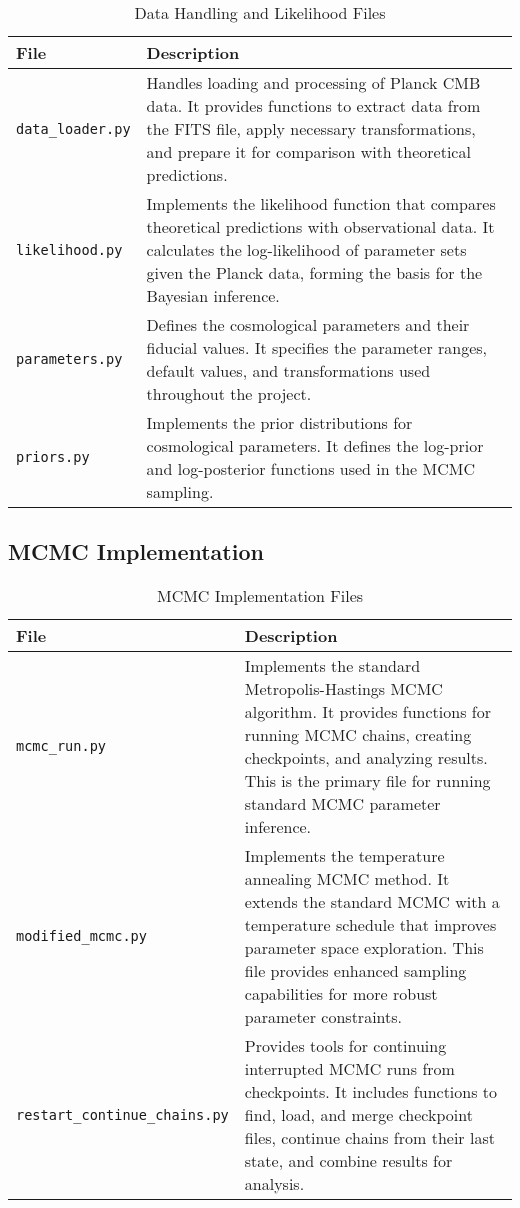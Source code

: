\documentclass[11pt]{article}
\begin{document}
\begin{table}[H]
\centering
\begin{tabular}{p{4cm}p{11cm}}
\toprule
\textbf{File} & \textbf{Description} \\
\midrule
\texttt{data\_loader.py} & Handles loading and processing of Planck CMB data. It provides functions to extract data from the FITS file, apply necessary transformations, and prepare it for comparison with theoretical predictions. \\
\addlinespace
\texttt{likelihood.py} & Implements the likelihood function that compares theoretical predictions with observational data. It calculates the log-likelihood of parameter sets given the Planck data, forming the basis for the Bayesian inference. \\
\addlinespace
\texttt{parameters.py} & Defines the cosmological parameters and their fiducial values. It specifies the parameter ranges, default values, and transformations used throughout the project. \\
\addlinespace
\texttt{priors.py} & Implements the prior distributions for cosmological parameters. It defines the log-prior and log-posterior functions used in the MCMC sampling. \\
\bottomrule
\end{tabular}
\caption{Data Handling and Likelihood Files}
\label{tab:data-likelihood-files}
\end{table}

\subsection{MCMC Implementation}

\begin{table}[H]
\centering
\begin{tabular}{p{4cm}p{11cm}}
\toprule
\textbf{File} & \textbf{Description} \\
\midrule
\texttt{mcmc\_run.py} & Implements the standard Metropolis-Hastings MCMC algorithm. It provides functions for running MCMC chains, creating checkpoints, and analyzing results. This is the primary file for running standard MCMC parameter inference. \\
\addlinespace
\texttt{modified\_mcmc.py} & Implements the temperature annealing MCMC method. It extends the standard MCMC with a temperature schedule that improves parameter space exploration. This file provides enhanced sampling capabilities for more robust parameter constraints. \\
\addlinespace
\texttt{restart\_continue\_chains.py} & Provides tools for continuing interrupted MCMC runs from checkpoints. It includes functions to find, load, and merge checkpoint files, continue chains from their last state, and combine results for analysis. \\
\bottomrule
\end{tabular}
\caption{MCMC Implementation Files}
\label{tab:mcmc-files}
\end{table}
\end{document}
